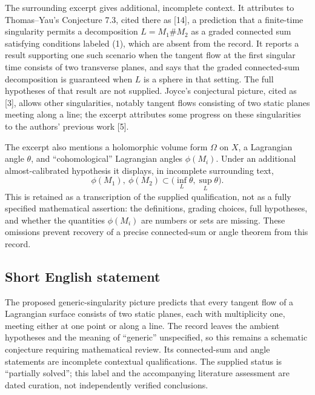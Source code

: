 \documentclass[11pt]{article}
\begin{document}
The surrounding excerpt gives additional, incomplete context. It attributes to Thomas--Yau's Conjecture 7.3, cited there as [14], a prediction that a finite-time singularity permits a decomposition \(L=M_1\#M_2\) as a graded connected sum satisfying conditions labeled (1), which are absent from the record. It reports a result supporting one such scenario when the tangent flow at the first singular time consists of two transverse planes, and says that the graded connected-sum decomposition is guaranteed when \(L\) is a sphere in that setting. The full hypotheses of that result are not supplied. Joyce's conjectural picture, cited as [3], allows other singularities, notably tangent flows consisting of two static planes meeting along a line; the excerpt attributes some progress on these singularities to the authors' previous work [5].

The excerpt also mentions a holomorphic volume form \(\Omega\) on \(X\), a Lagrangian angle \(\theta\), and ``cohomological'' Lagrangian angles \(\phi(M_i)\). Under an additional almost-calibrated hypothesis it displays, in incomplete surrounding text,
\[
\phi(M_1),\ \phi(M_2)\subset\bigl(\inf_L\theta,\sup_L\theta\bigr).
\]
This is retained as a transcription of the supplied qualification, not as a fully specified mathematical assertion: the definitions, grading choices, full hypotheses, and whether the quantities \(\phi(M_i)\) are numbers or sets are missing. These omissions prevent recovery of a precise connected-sum or angle theorem from this record.
\subsection{Short English statement}
The proposed generic-singularity picture predicts that every tangent flow of a Lagrangian surface consists of two static planes, each with multiplicity one, meeting either at one point or along a line. The record leaves the ambient hypotheses and the meaning of ``generic'' unspecified, so this remains a schematic conjecture requiring mathematical review. Its connected-sum and angle statements are incomplete contextual qualifications. The supplied status is ``partially solved''; this label and the accompanying literature assessment are dated curation, not independently verified conclusions.
\end{document}
